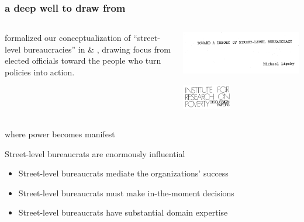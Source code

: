 \documentclass[presentation]{subfiles}
\begin{document}










\begin{frame}\frametitle{a deep well to draw from}
    
    \begin{columns}
    \begin{column}{0.5\textwidth}
{\citeauthor{lipsky1980street} formalized our conceptualization of ``street-level bureaucracies'' in
\citeyear{lipsky1969toward} \& \citeyear{lipsky1980street}, drawing focus from elected officials toward the people who \alert{turn policies into action}.}
\end{column}
\begin{column}{0.5\textwidth}
\includegraphics[width=\textwidth]{figures/books/slb_lipsky.png}

\begin{center}
\includegraphics[width=0.4\textwidth]{figures/books/irp.png}
\end{center}
\end{column}
\end{columns}

\end{frame}

\begin{frame}{where power becomes manifest}

  Street-level bureaucrats are enormously influential

  \begin{itemize}
    \item Street-level bureaucrats \alert<2,5->{mediate} the organizations' success
    \item Street-level bureaucrats must make \alert<3,5->{in-the-moment} decisions
    \item Street-level bureaucrats have substantial \alert<4,5->{domain expertise}
  \end{itemize}

\end{frame}
\end{document}
